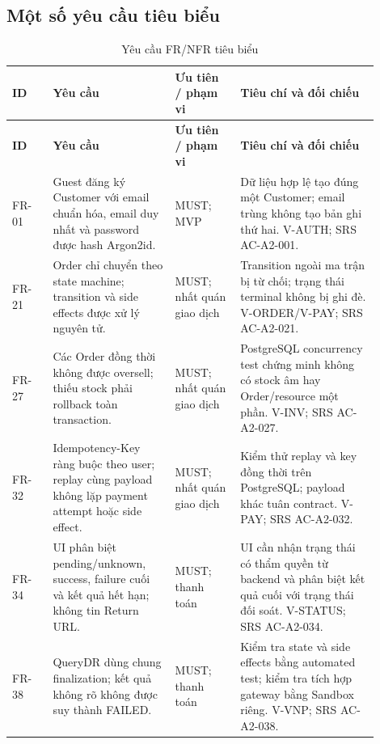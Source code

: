 \subsection{Một số yêu cầu tiêu biểu}
\begingroup\small
\renewcommand{\arraystretch}{1.2}
\begin{longtable}{>{\raggedright\arraybackslash}p{0.10\linewidth}>{\raggedright\arraybackslash}p{0.30\linewidth}>{\raggedright\arraybackslash}p{0.16\linewidth}>{\raggedright\arraybackslash}p{0.34\linewidth}}
\caption{Yêu cầu FR/NFR tiêu biểu}\label{tab:auto-requirements-summary-1}\\
\hline
\textbf{ID} & \textbf{Yêu cầu} & \textbf{Ưu tiên / phạm vi} & \textbf{Tiêu chí và đối chiếu} \\ \hline
\endfirsthead
\textbf{ID} & \textbf{Yêu cầu} & \textbf{Ưu tiên / phạm vi} & \textbf{Tiêu chí và đối chiếu} \\ \hline
\endhead
FR-01 & Guest đăng ký Customer với email chuẩn hóa, email duy nhất và password được hash Argon2id. & MUST; MVP & Dữ liệu hợp lệ tạo đúng một Customer; email trùng không tạo bản ghi thứ hai. V-AUTH; SRS AC-A2-001. \\ \hline
FR-21 & Order chỉ chuyển theo state machine; transition và side effects được xử lý nguyên tử. & MUST; nhất quán giao dịch & Transition ngoài ma trận bị từ chối; trạng thái terminal không bị ghi đè. V-ORDER/V-PAY; SRS AC-A2-021. \\ \hline
FR-27 & Các Order đồng thời không được oversell; thiếu stock phải rollback toàn transaction. & MUST; nhất quán giao dịch & PostgreSQL concurrency test chứng minh không có stock âm hay Order/resource một phần. V-INV; SRS AC-A2-027. \\ \hline
FR-32 & Idempotency-Key ràng buộc theo user; replay cùng payload không lặp payment attempt hoặc side effect. & MUST; nhất quán giao dịch & Kiểm thử replay và key đồng thời trên PostgreSQL; payload khác tuân contract. V-PAY; SRS AC-A2-032. \\ \hline
FR-34 & UI phân biệt pending/unknown, success, failure cuối và kết quả hết hạn; không tin Return URL. & MUST; thanh toán & UI cần nhận trạng thái có thẩm quyền từ backend và phân biệt kết quả cuối với trạng thái đối soát. V-STATUS; SRS AC-A2-034. \\ \hline
FR-38 & QueryDR dùng chung finalization; kết quả không rõ không được suy thành FAILED. & MUST; thanh toán & Kiểm tra state và side effects bằng automated test; kiểm tra tích hợp gateway bằng Sandbox riêng. V-VNP; SRS AC-A2-038. \\ \hline

\end{longtable}
